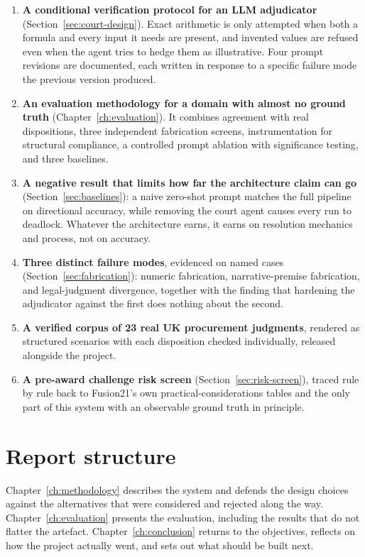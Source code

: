 \begin{enumerate}
 \item \textbf{A conditional verification protocol for an LLM adjudicator}
 (Section~\ref{sec:court-design}). Exact arithmetic is only attempted when
 both a formula and every input it needs are present, and invented values are
 refused even when the agent tries to hedge them as illustrative. Four prompt
 revisions are documented, each written in response to a specific failure
 mode the previous version produced.
 \item \textbf{An evaluation methodology for a domain with almost no ground
 truth} (Chapter~\ref{ch:evaluation}). It combines agreement with real
 dispositions, three independent fabrication screens, instrumentation for
 structural compliance, a controlled prompt ablation with significance
 testing, and three baselines.
 \item \textbf{A negative result that limits how far the architecture claim can
 go} (Section~\ref{sec:baselines}): a naive zero-shot prompt matches the full
 pipeline on directional accuracy, while removing the court agent causes
 every run to deadlock. Whatever the architecture earns, it earns on
 resolution mechanics and process, not on accuracy.
 \item \textbf{Three distinct failure modes}, evidenced on named cases
 (Section~\ref{sec:fabrication}): numeric fabrication, narrative-premise
 fabrication, and legal-judgment divergence, together with the finding that
 hardening the adjudicator against the first does nothing about the
 second.
 \item \textbf{A verified corpus of 23 real UK procurement judgments}, rendered
 as structured scenarios with each disposition checked individually, released
 alongside the project.
 \item \textbf{A pre-award challenge risk screen} (Section~\ref{sec:risk-screen}),
 traced rule by rule back to Fusion21's own practical-considerations tables
 and the only part of this system with an observable ground truth in
 principle.
\end{enumerate}

\section{Report structure}

Chapter~\ref{ch:methodology} describes the system and defends the design choices
against the alternatives that were considered and rejected along the way.
Chapter~\ref{ch:evaluation} presents the evaluation, including the results that
do not flatter the artefact. Chapter~\ref{ch:conclusion} returns to the
objectives, reflects on how the project actually went, and sets out what should
be built next.